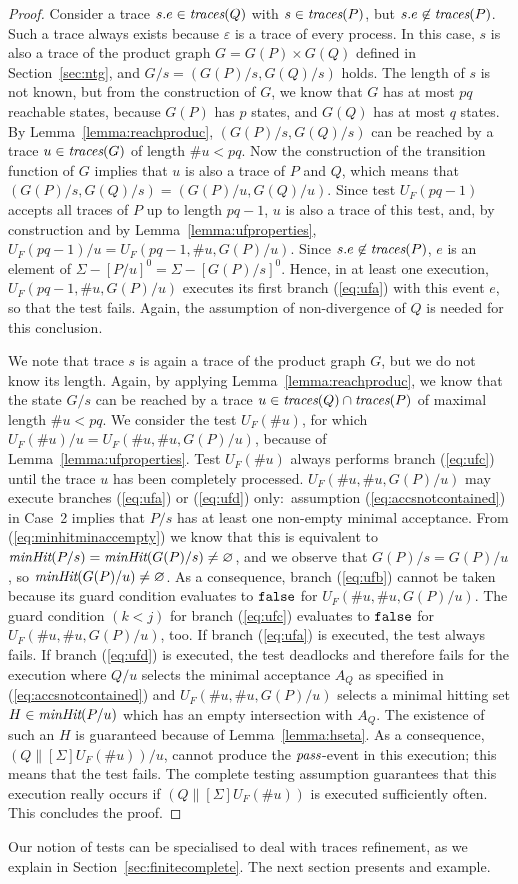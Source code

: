 \begin{proof}
\medskip
{}
Consider a  trace $s.e\in\text{\it traces}(Q)$ with $s\in\text{\it traces}(P)$,
but $s.e\not\in\text{\it traces}(P)$. Such a trace always exists because $\varepsilon$ is
a trace of every process. In this case, $s$ is also a trace of the product
graph $G = G(P)\times G(Q)$ defined in Section~\ref{sec:ntg}, and $G/s =
(G(P)/s,G(Q)/s)$ holds. The length of $s$ is not known, but from the
construction of $G$,  we know that $G$ has at most $pq$ reachable states,
because $G(P)$ has $p$ states, and $G(Q)$ has at most $q$ states. By
Lemma~\ref{lemma:reachproduc}, $(G(P)/s,G(Q)/s)$ can be reached by a trace
$u\in\text{\it traces}(G)$ of length $\#u < pq$. Now the construction of the transition
function of $G$ implies that $u$ is also a trace of $P$ and $Q$, which means
that $(G(P)/s,G(Q)/s) = (G(P)/u,G(Q)/u)$. Since test $U_F(pq-1)$ accepts all
traces of $P$ up to length $pq-1$, $u$ is also a trace of this test, and, by
construction and by Lemma~\ref{lemma:ufproperties}, $U_F(pq-1)/u =
U_F(pq-1,\#u,G(P)/u)$. Since $s.e\not\in\text{\it traces}(P)$, $e$ is an element of
$\Sigma-[P/u]^0 = \Sigma - [G(P)/s]^0$. Hence, in at least one execution,
$U_F(pq-1,\#u,G(P)/u)$ executes its first branch (\ref{eq:ufa}) with this
event $e$, so that the test fails. Again, the assumption of non-divergence of
$Q$ is needed for this conclusion.

\medskip
{} We note that trace $s$ is again a trace of the
product graph $G$, but we do not know its length. Again, by applying
Lemma~\ref{lemma:reachproduc}, we know that the state $G/s$ can be reached by
a trace $u\in\text{\it traces}(Q)\cap\text{\it traces}(P)$ of maximal length $\#u < pq$. We consider
the test $U_F(\# u)$, for which $U_F(\# u)/u = U_F(\#u,\#u,G(P)/u)$, because
of Lemma~\ref{lemma:ufproperties}. Test $U_F(\#u)$  always performs branch
(\ref{eq:ufc}) until the trace $u$ has been completely processed.  
 $U_F(\#u,\#u,G(P)/u)$ may execute
branches (\ref{eq:ufa}) or (\ref{eq:ufd}) only:~assumption
(\ref{eq:accsnotcontained}) in Case~2 implies that $P/s$ has at least one
non-empty minimal acceptance. From (\ref{eq:minhitminaccempty}) we know that
this is equivalent to $\text{\it minHit}(P/s) = \text{\it minHit}(G(P)/s)\neq\varnothing$, and
we observe that $G(P)/s = G(P)/u$, so $\text{\it minHit}(G(P)/u)\neq\varnothing$. As a
consequence, branch (\ref{eq:ufb}) cannot be taken because its guard
condition evaluates to $\mbox{{\tt false}}$  for $U_F(\#u,\#u,G(P)/u)$. The guard condition
$(k < j)$ for branch (\ref{eq:ufc}) evaluates to $\mbox{{\tt false}}$ for
$U_F(\#u,\#u,G(P)/u)$, too. If branch (\ref{eq:ufa}) is executed, the test
always fails. If branch (\ref{eq:ufd}) is executed, the test   deadlocks and therefore 
fails for the
execution where 
$Q/u$ selects the minimal acceptance $A_Q$ as specified in (\ref{eq:accsnotcontained})
and $U_F(\#u,\#u,G(P)/u)$ selects 
a minimal hitting set $H\in\text{\it minHit}(P/u)$ which has an empty intersection with   $A_Q$.
The existence of
such an $H$ is guaranteed because of Lemma~\ref{lemma:hseta}. As a
consequence,   $(Q\parallel[\Sigma]U_F(\# u))/u$,   cannot produce the
${\text{\it pass}}$-event in this execution; 
this means that the test fails. The complete testing assumption guarantees that 
this execution really occurs if $(Q\parallel[\Sigma]U_F(\# u))$ is executed sufficiently often.
This concludes the proof.
\xbox 
\end{proof}
%
Our notion of tests can be specialised to deal with traces refinement, as we
explain in Section~\ref{sec:finitecomplete}.
The next section presents and example.

